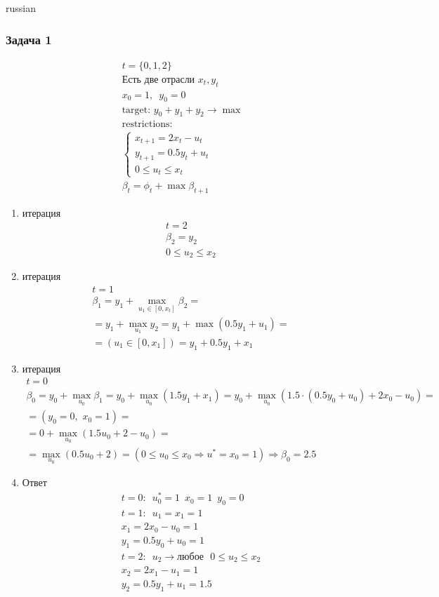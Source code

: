 \documentclass{article}
\begin{document}
\begin{otherlanguage*}{russian}
\begin{enumerate}
\subsubsection*{Задача 1}
\begin{align*}
t = \{ 0, 1, 2 \} \\
\text{Есть две отрасли } x_t, y_t \\
x_0 = 1, \,\,\, y_0 = 0 \\
\text{target: } y_0 + y_1 + y_2 \rightarrow \max \\
\text{restrictions:} \\
\begin{cases}
x_{t+1} = 2 x_{t} - u_t  \\
y_{t+1} = 0.5 y_t + u_t \\
0 \le u_t \le x_t 
\end{cases}  \\
\beta_t = \phi_t + \max \beta_{t+1} 
\end{align*}
\begin{enumerate}
\item итерация
\begin{align*}
t = 2 \\
\beta_2 = y_2 \\
0 \le u_2 \le x_2 
\end{align*}
\item итерация
\begin{align*}
t = 1 \\ 
\beta_1 = y_1 + \max_{u_1 \in [0, x_t] } \beta_2 = \\
= y_1 + \max_{u_1} y_2 = y_1 + \max (0.5 y_1 + u_1) =  \\ 
= (u_1 \in [0, x_1] ) = y_1 + 0.5 y_1 + x_1 
\end{align*}
\item итерация 
\begin{align*}
t = 0 \\
\beta_0 = y_0 + \max_{u_0} \beta_1 = y_0 + \max_{u_0} (1.5 y_1 + x_1) = y_0 + \max_{u_0} (1.5 \cdot (0.5 y_0 + u_0) + 2 x_0 - u_0 ) = \\ 
= (y_0 = 0, \,\, x_0 = 1 ) = \\ = 0 + \max_{u_0} (1.5 u_0 + 2 - u_0) = \\ = \max_{u_0} (0.5 u_0 + 2) = (0 \le u_0 \le x_0 \Rightarrow u^* = x_0 = 1 ) \Rightarrow \beta_0 = 2.5 
\end{align*}
\item Ответ 
\begin{align*}
t = 0: \,\,\, u_0^* = 1 \,\,\, x_0 = 1 \,\,\, y_0 = 0 \\
t = 1: \,\,\, u_1 = x_1 = 1 \\
x_1 = 2 x_0 - u_0 = 1 \\
y_1 = 0.5 y_0 + u_0 = 1 \\
t = 2 : \,\,\, u_2 \rightarrow \text{любое} \,\,\,\, 0 \le u_2 \le x_2 \\
x_2 = 2 x_1 - u_1 = 1 \\
y_2 = 0.5 y_1 + u_1 = 1.5 
\end{align*}
\end{enumerate}
\end{enumerate}

\end{otherlanguage*}
\end{document}
